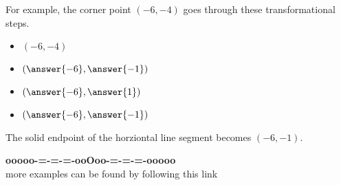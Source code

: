 \documentclass{ximera}
\begin{document}
\begin{procedure}
For example, the corner point $(-6, -4)$ goes through these transformational steps.

\begin{itemize}
\item $(-6, -4)$
\item $\left( \answer{-6},  \answer{-1} \right)$
\item $\left( \answer{-6},  \answer{1} \right)$
\item $\left( \answer{-6},  \answer{-1} \right)$
\end{itemize}

The solid endpoint of the horziontal line segment becomes $(-6, -1)$.
\end{procedure}



































\begin{center}
\textbf{\textcolor{green!50!black}{ooooo-=-=-=-ooOoo-=-=-=-ooooo}} \\

more examples can be found by following this link\\ 

\end{center}
\end{document}
